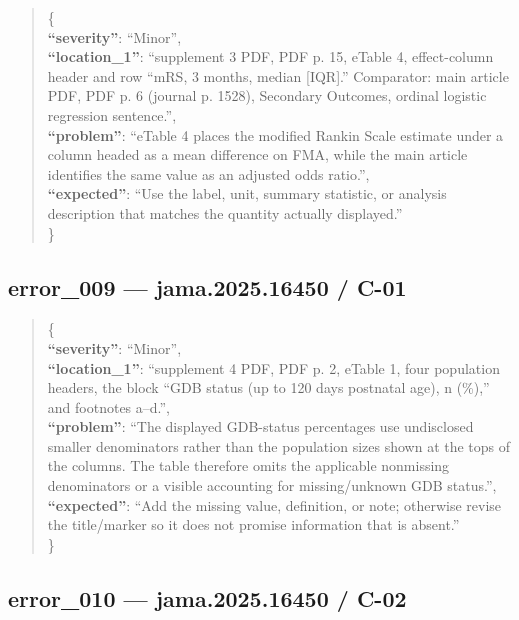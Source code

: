 \documentclass[
  letterpaper,
  9pt]{extreport}
\begin{document}
\begin{quote}
\{\\
\textbf{``severity''}: ``Minor'',\\
\textbf{``location\_1''}: ``supplement 3 PDF, PDF p. 15, eTable 4,
effect-column header and row ``mRS, 3 months, median {[}IQR{]}.''
Comparator: main article PDF, PDF p. 6 (journal p. 1528), Secondary
Outcomes, ordinal logistic regression sentence.'',\\
\textbf{``problem''}: ``eTable 4 places the modified Rankin Scale
estimate under a column headed as a mean difference on FMA, while the
main article identifies the same value as an adjusted odds ratio.'',\\
\textbf{``expected''}: ``Use the label, unit, summary statistic, or
analysis description that matches the quantity actually displayed.''\\
\}
\end{quote}

\hypertarget{error_009--jama202516450--c-01}{%
\subsection{error\_009 --- jama.2025.16450 /
C-01}\label{error_009--jama202516450--c-01}}

\begin{quote}
\{\\
\textbf{``severity''}: ``Minor'',\\
\textbf{``location\_1''}: ``supplement 4 PDF, PDF p. 2, eTable 1, four
population headers, the block ``GDB status (up to 120 days postnatal
age), n (\%),'' and footnotes a--d.'',\\
\textbf{``problem''}: ``The displayed GDB-status percentages use
undisclosed smaller denominators rather than the population sizes shown
at the tops of the columns. The table therefore omits the applicable
nonmissing denominators or a visible accounting for missing/unknown GDB
status.'',\\
\textbf{``expected''}: ``Add the missing value, definition, or note;
otherwise revise the title/marker so it does not promise information
that is absent.''\\
\}
\end{quote}

\hypertarget{error_010--jama202516450--c-02}{%
\subsection{error\_010 --- jama.2025.16450 /
C-02}\label{error_010--jama202516450--c-02}}
\end{document}
